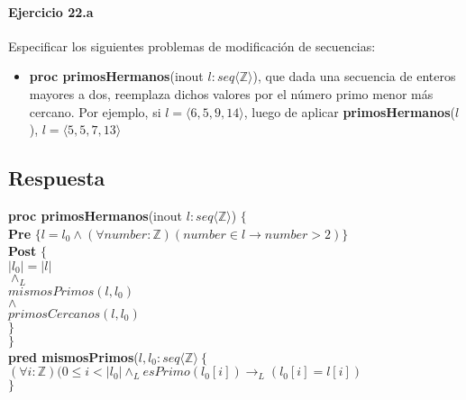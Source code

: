 \documentclass[a4paper]{article}
\begin{document}
\paragraph*{Ejercicio 22.a} Especificar los siguientes problemas de modificación de secuencias:
	\begin{itemize}
		\item \textbf{proc primosHermanos}(inout $l:seq\langle \mathbb{Z}\rangle$), que dada una secuencia de enteros mayores a dos, reemplaza dichos valores por el número primo menor más cercano. Por ejemplo, si $l=\langle 6,5,9,14 \rangle$, luego de aplicar \textbf{primosHermanos}($l$), $l=\langle 5,5,7,13 \rangle$
	\end{itemize}
	
\subsection*{Respuesta}
			
			\textbf{proc primosHermanos}(inout $l:seq\langle \mathbb{Z}\rangle$) $\{$\smallskip \\
			\hspace*{6mm} \textbf{Pre }$\{l=l_0 \wedge 
				(\forall number:\mathbb{Z})(number\in l \rightarrow
			 number>2)\}$\smallskip \\
			\hspace*{6mm} \textbf{Post }$\{$\\
			\hspace*{6mm} $|l_0|=|l|$\\
			\hspace*{6mm} $\wedge_L$\\
			\hspace*{6mm} $mismosPrimos(l,l_0 )$\\
			\hspace*{6mm} $\wedge$\\
			\hspace*{6mm} $primosCercanos(l,l_0)$\\
			\hspace*{6mm} $\}$\\
			\hspace*{5mm}$\}$\smallskip \\
			
			\textbf{pred mismosPrimos}($l,l_0: seq\langle\mathbb{Z}\rangle
			\ \{$\smallskip \\
			\hspace*{6mm}$(\forall i:\mathbb{Z})(0\leq i < |l_0|\wedge_L esPrimo(l_0[i])
				\rightarrow_L(l_0[i]=l[i])$\\
			\hspace*{5mm}$\}$\smallskip \\
			
\end{document}
